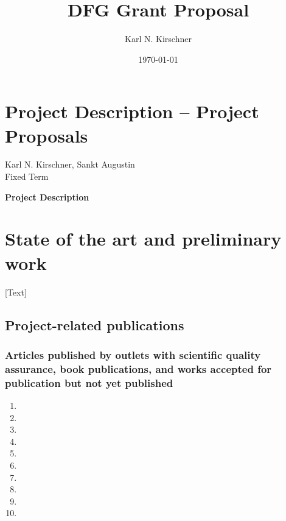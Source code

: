\documentclass[red]{dfg_proposal_en}
\title{DFG Grant Proposal}
\author{Karl N. Kirschner}
\date{\today}
\begin{document}
    \afterpage{\aftergroup\restoregeometry}
    \thispagestyle{firstpagefooter}


\section*{\normalsize Project Description -- Project Proposals}
\noindent Karl N. Kirschner, Sankt Augustin\\
Fixed Term

\hrulefill
\bigskip

\noindent\textbf{Project Description}
\section{State of the art and preliminary work}  %
[Text]

\subsection{Project-related publications}  %

\subsubsection{Articles published by outlets with scientific quality assurance, book publications, and works accepted for publication but not yet published}  %
    \begin{enumerate}
        \item \bibentry{}
        \item \bibentry{}
        \item \bibentry{}
        \item \bibentry{}
        \item \bibentry{}
        \item \bibentry{}
        \item \bibentry{}
        \item \bibentry{}
        \item \bibentry{}
        \item \bibentry{}
    \end{enumerate}
    
\end{document}
